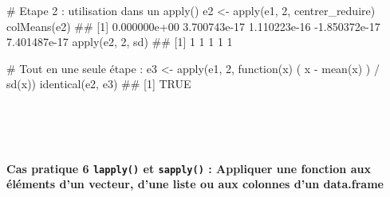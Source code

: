 \documentclass[12pt,]{article}
\newenvironment{Shaded}{}{}
\newcommand{\KeywordTok}[1]{\textcolor[rgb]{0.00,0.00,1.00}{{#1}}}
\newcommand{\DecValTok}[1]{{#1}}
\newcommand{\StringTok}[1]{\textcolor[rgb]{0.00,0.50,0.50}{{#1}}}
\newcommand{\CommentTok}[1]{\textcolor[rgb]{0.00,0.50,0.00}{{#1}}}
\newcommand{\NormalTok}[1]{{#1}}
\let\oldparagraph\paragraph
\renewcommand{\paragraph}[1]{\oldparagraph{#1}\mbox{}}
\begin{document}
\begin{enumerate}
\begin{Shaded}
\begin{Highlighting}[]
\CommentTok{# Etape 2 : utilisation dans un apply()}
\NormalTok{e2 <-}\StringTok{ }\KeywordTok{apply}\NormalTok{(e1, }\DecValTok{2}\NormalTok{, centrer_reduire)}
\KeywordTok{colMeans}\NormalTok{(e2)}
\NormalTok{## [1]  0.000000e+00  3.700743e-17  1.110223e-16 -1.850372e-17  7.401487e-17}
\KeywordTok{apply}\NormalTok{(e2, }\DecValTok{2}\NormalTok{, sd)}
\NormalTok{## [1] 1 1 1 1 1}

\CommentTok{# Tout en une seule étape :}
\NormalTok{e3 <-}\StringTok{ }\KeywordTok{apply}\NormalTok{(e1, }\DecValTok{2}\NormalTok{, function(x) ( x -}\StringTok{ }\KeywordTok{mean}\NormalTok{(x) ) /}\StringTok{ }\KeywordTok{sd}\NormalTok{(x))}
\KeywordTok{identical}\NormalTok{(e2, e3)}
\NormalTok{## [1] TRUE}
\end{Highlighting}
\end{Shaded}

  ~
\end{enumerate}

~

\paragraph{\texorpdfstring{\textbf{Cas pratique 6} \texttt{lapply()} et
\texttt{sapply()} : Appliquer une fonction aux éléments d'un vecteur,
d'une liste ou aux colonnes d'un
data.frame}{Cas pratique 6 lapply() et sapply() : Appliquer une fonction aux éléments d'un vecteur, d'une liste ou aux colonnes d'un data.frame}}\label{cas-pratique-6-lapply-et-sapply-appliquer-une-fonction-aux-elements-dun-vecteur-dune-liste-ou-aux-colonnes-dun-data.frame}
\end{document}
